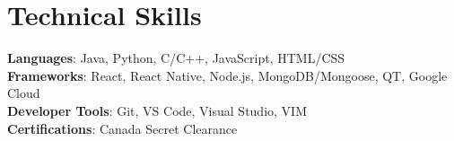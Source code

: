 \documentclass[letterpaper,11pt]{article}
\begin{document}
\section{Technical Skills}
 \begin{itemize}[leftmargin=0.15in, label={}]
    \small{\item{
     \textbf{Languages}{:  Java, Python, C/C++, JavaScript, HTML/CSS} \\
     \textbf{Frameworks}{: React, React Native, Node.js, MongoDB/Mongoose, QT, Google Cloud} \\
     \textbf{Developer Tools}{: Git, VS Code, Visual Studio, VIM} \\
     \textbf{Certifications}{:  Canada Secret Clearance}
    }}
 \end{itemize}



\end{document}
